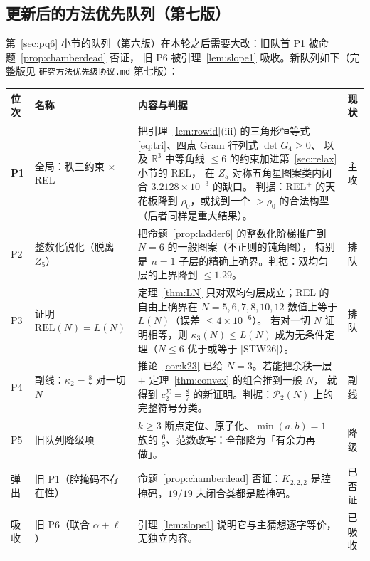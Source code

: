 \documentclass[UTF8,11pt]{ctexart}
\theoremstyle{definition}
\newcommand{\R}{\mathbb{R}}
\newcommand{\STW}{\textup{[STW26]}}
\begin{document}
\subsection{更新后的方法优先队列（第七版）}\label{sec:pq7}

第~\ref{sec:pq6} 小节的队列（第六版）在本轮之后需要大改：旧队首 P1 被命题~\ref{prop:chamberdead} 否证，
旧 P6 被引理~\ref{lem:slope1} 吸收。新队列如下（完整版见 \texttt{研究方法优先级协议.md} 第七版）：

\begin{center}\small
\begin{tabular}{p{1.1cm}p{3.1cm}p{8.6cm}p{1.6cm}}
\toprule
位次 & 名称 & 内容与判据 & 现状\\
\midrule
\textbf{P1} & 全局：秩三约束 $\times$ REL &
把引理~\ref{lem:rowid}(iii) 的三角形恒等式 \eqref{eq:tri}、四点 Gram 行列式 $\det G_4\ge0$、
以及 $\R^3$ 中等角线 $\le6$ 的约束加进第~\ref{sec:relax} 小节的 REL，
在 $Z_5$-对称五角星图案类内闭合 $3.2128\times10^{-3}$ 的缺口。
判据：REL$^+$ 的天花板降到 $\rho_0$，或找到一个 $>\rho_0$ 的合法构型（后者同样是重大结果）。 & 主攻\\
P2 & 整数化锐化（脱离 $Z_5$） &
把命题~\ref{prop:ladder6} 的整数化阶梯推广到 $N=6$ 的一般图案（不正则的钝角图），
特别是 $n=1$ 子层的精确上确界。判据：双均匀层的上界降到 $\le1.29$。 & 排队\\
P3 & 证明 $\mathrm{REL}(N)=L(N)$ &
定理~\ref{thm:LN} 只对双均匀层成立；REL 的自由上确界在 $N=5,6,7,8,10,12$ 数值上等于 $L(N)$（误差 $\le4\times10^{-6}$）。
若对一切 $N$ 证明相等，则 $\kappa_3(N)\le L(N)$ 成为无条件定理（$N\le6$ 优于或等于 \STW）。 & 排队\\
P4 & 副线：$\kappa_2=\frac87$ 对一切 $N$ &
推论~\ref{cor:k23} 已给 $N=3$。若能把余秩一层 $+$ 定理~\ref{thm:convex} 的组合推到一般 $N$，
就得到 $c_2^\Sigma=\frac87$ 的新证明。判据：$\mathcal P_2(N)$ 上的完整符号分类。 & 副线\\
P5 & 旧队列降级项 &
$k\ge3$ 断点定位、原子化、$\min(a,b)=1$ 族的 $\frac65$、范数改写：全部降为「有余力再做」。 & 降级\\
\midrule
弹出 & 旧 P1（腔掩码不存在性） & 命题~\ref{prop:chamberdead} 否证：$K_{2,2,2}$ 是腔掩码，$19/19$ 未闭合类都是腔掩码。 & 已否证\\
吸收 & 旧 P6（联合 $\alpha+\ell$） & 引理~\ref{lem:slope1} 说明它与主猜想逐字等价，无独立内容。 & 已吸收\\
\bottomrule
\end{tabular}
\end{center}
\end{document}
